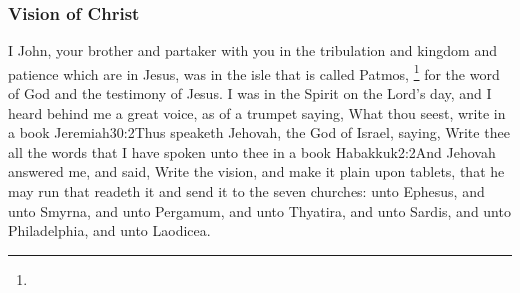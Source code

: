 \subsubsection*{Vision of Christ}

I John, your brother and partaker with you in the tribulation and kingdom and patience which are in Jesus, was in the isle that is called Patmos,%
	\footnote{ %
			}%
for the word of God and the testimony of Jesus. %
I was in the Spirit on the Lord’s day, and I heard behind me a great voice, as of a trumpet %
saying, What thou seest, write in a book%
%
				{Jeremiah}{30:2}{Thus speaketh Jehovah, the God of Israel, saying, Write thee all the words that I have spoken unto thee in a book}%
				{Habakkuk}{2:2}{And Jehovah answered me, and said, Write the vision, and make it plain upon tablets, that he may run that readeth it}%
and send it to the seven churches: unto Ephesus, and unto Smyrna, and unto Pergamum, and unto Thyatira, and unto Sardis, and unto Philadelphia, and unto Laodicea.

